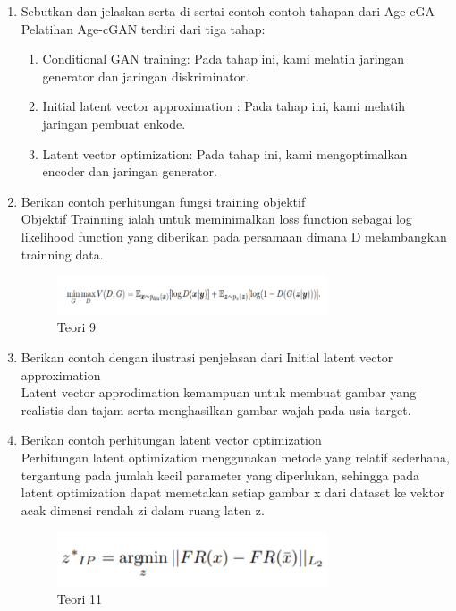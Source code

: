 \begin{enumerate}
\item Sebutkan dan jelaskan serta di sertai contoh-contoh tahapan dari Age-cGA
	\hfill\\
	Pelatihan Age-cGAN terdiri dari tiga tahap: 
	\begin{enumerate}
	\item Conditional GAN training: Pada tahap ini, kami melatih jaringan generator dan jaringan diskriminator.
	\item Initial latent vector approximation : Pada tahap ini, kami melatih jaringan pembuat enkode.
	\item Latent vector optimization: Pada tahap ini, kami mengoptimalkan encoder dan jaringan generator.
	\end{enumerate}
	
	
\item Berikan contoh perhitungan fungsi training objektif
	\hfill\\
	Objektif Trainning ialah untuk meminimalkan loss function sebagai log likelihood function yang diberikan pada persamaan dimana D melambangkan trainning data.
	
\begin{figure}[H]
    \includegraphics[width=8cm]{figures/1174084/9/teori9.png}
    \centering
    \caption{Teori 9}
\end{figure}


\item Berikan contoh dengan ilustrasi penjelasan dari Initial latent vector approximation
	\hfill\\
	Latent vector approdimation kemampuan untuk membuat gambar yang realistis dan tajam serta menghasilkan gambar wajah pada usia target.
			
	

\item Berikan contoh perhitungan latent vector optimization
	\hfill\\
	Perhitungan latent optimization menggunakan metode yang relatif sederhana, tergantung pada jumlah kecil parameter yang diperlukan, sehingga pada latent optimization dapat memetakan setiap gambar x dari dataset ke vektor acak dimensi rendah zi dalam ruang laten z.	
	
\begin{figure}[H]
    \includegraphics[width=8cm]{figures/1174084/9/teori11.png}
    \centering
    \caption{Teori 11}
\end{figure}	
	
\end{enumerate}


